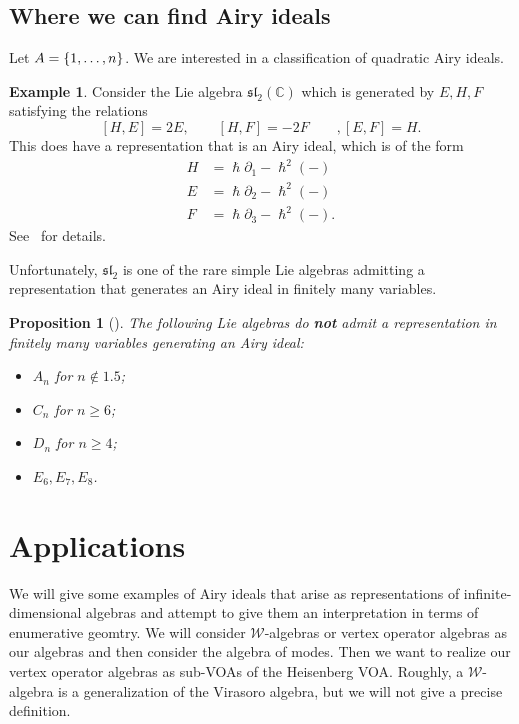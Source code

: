 \documentclass[leqno, openany]{memoir}
\newtheorem{prop}[thm]{Proposition}
\theoremstyle{definition}
\newtheorem{exm}[thm]{Example}
\theoremstyle{remark}
\theoremstyle{plain}
\theoremstyle{definition}
\theoremstyle{remark}
\newcommand{\C}{\mathbb{C}}
\newcommand{\mc}[1]{\mathcal{#1}}
\newcommand{\mf}[1]{\mathfrak{#1}}
\begin{document}
\subsection{Where we can find Airy ideals}

Let $A = \qty{1, \ldots, n}$. We are interested in a classification of quadratic Airy ideals.

\begin{exm}
    Consider the Lie algebra $\mf{sl}_2(\C)$ which is generated by $E, H, F$ satisfying the relations
    \[ [H, E] = 2E, \qquad [H, F] = -2F \qquad, [E, F] = H. \]
    This does have a representation that is an Airy ideal, which is of the form
    \begin{align*}
        H &= \hslash \partial_1 - \hslash^2(-) \\
        E &= \hslash \partial_2 - \hslash^2(-) \\
        F &= \hslash \partial_3 - \hslash^2(-).
    \end{align*}
    See~\cite{abcdtoprec} for details.
\end{exm}

Unfortunately, $\mf{sl}_2$ is one of the rare simple Lie algebras admitting a representation that generates an Airy ideal in finitely many variables.
\begin{prop}[{\cite[Proposition 6.9]{abcdtoprec}}]
    The following Lie algebras do \textbf{not} admit a representation in finitely many variables generating an Airy ideal:
    \begin{itemize}
        \item $A_n$ for $n \notin \qty{1, 5}$;
        \item $C_n$ for $n \geq 6$;
        \item $D_n$ for $n \geq 4$;
        \item $E_6, E_7, E_8$.
    \end{itemize}
\end{prop}

\section{Applications}

We will give some examples of Airy ideals that arise as representations of infinite-dimensional algebras and attempt to give them an interpretation in terms of enumerative geomtry. We will consider $\mc{W}$-algebras or vertex operator algebras as our algebras and then consider the algebra of modes. Then we want to realize our vertex operator algebras as sub-VOAs of the Heisenberg VOA. Roughly, a $\mc{W}$-algebra is a generalization of the Virasoro algebra, but we will not give a precise definition.
\end{document}
